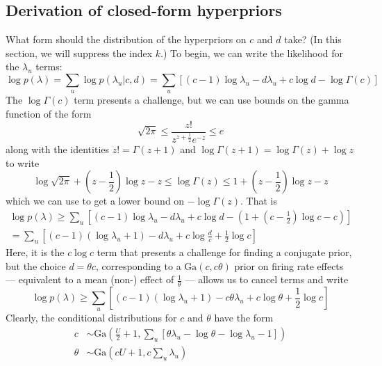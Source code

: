 \documentclass[11pt]{article}
\begin{document}
\subsection{Derivation of closed-form hyperpriors}
What form should the distribution of the hyperpriors on $c$ and $d$ take? (In this section, we will suppress the index $k$.) To begin, we can write the likelihood for the $\lambda_u$ terms:
\begin{equation}
    \log p(\lambda) = \sum_u \log p(\lambda_u|c, d) = \sum_u \left[ 
    (c - 1) \log \lambda_u - d\lambda_u + c \log d - \log \Gamma(c) 
    \right]
\end{equation}
The $\log \Gamma(c)$ term presents a challenge, but we can use bounds on the gamma function of the form
\begin{equation}
    \sqrt{2\pi} \le \frac{z!}{z^{z+\frac{1}{2}} e^{-z}} \le e
\end{equation}
along with the identities $z! = \Gamma(z + 1)$ and $\log \Gamma(z + 1) = \log \Gamma (z) + \log z$ to write
\begin{equation}
    \log \sqrt{2\pi} + \left(z - \frac{1}{2}\right)\log z - z \le
    \log \Gamma (z) \le 1 + \left(z - \frac{1}{2}\right) \log z - z
\end{equation}
which we can use to get a lower bound on $-\log \Gamma (z)$. That is
\begin{multline}
    \log p(\lambda) \ge \sum_u \left[ 
    (c - 1) \log \lambda_u - d\lambda_u + c \log d - 
    \left(1 + \left(c - \frac{1}{2}\right) \log c - c\right)
    \right] \\
    = \sum_u \left[
    (c - 1) (\log \lambda_u + 1) - d\lambda_u + c \log \frac{d}{c} + 
    \frac{1}{2} \log c
    \right] 
\end{multline}
Here, it is the $c\log c$ term that presents a challenge for finding a conjugate prior, but the choice $d = \theta c$, corresponding to a $\mathrm{Ga}(c, c\theta)$ prior on firing rate effects --- equivalent to a mean (non-) effect of $\frac{1}{\theta}$ --- allows us to cancel terms and write
\begin{equation}
    \log p(\lambda) \ge \sum_u \left[ 
    (c - 1) (\log \lambda_u + 1) - c\theta\lambda_u + c \log \theta + \frac{1}{2}\log c\right]
\end{equation}
Clearly, the conditional distributions for $c$ and $\theta$ have the form 
\begin{align}
    c &\sim \mathrm{Ga}\left(\frac{U}{2} + 1, \sum_u \left[ 
    \theta\lambda_{u} - \log \theta - \log \lambda_{u} - 1
    \right]\right) \\
    \theta &\sim \mathrm{Ga}\left(
    cU + 1, c \sum_u \lambda_u
    \right)
\end{align}
\end{document}
